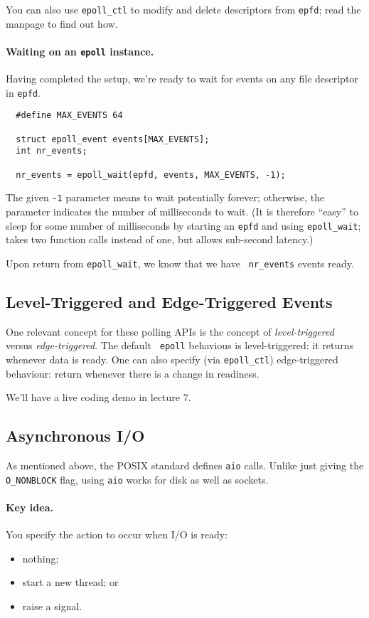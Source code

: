 \documentclass[11pt]{article}
\begin{document}
You can also use {\tt epoll\_ctl} to modify and delete descriptors from {\tt epfd}; read the manpage to find out how.

\paragraph{Waiting on an {\tt epoll} instance.} Having completed
the setup, we're ready to wait for events on any file descriptor in {\tt epfd}.
    \begin{lstlisting}
  #define MAX_EVENTS 64

  struct epoll_event events[MAX_EVENTS];
  int nr_events;

  nr_events = epoll_wait(epfd, events, MAX_EVENTS, -1);
    \end{lstlisting}

The given {\tt -1} parameter means to wait potentially forever;
otherwise, the parameter indicates the number of milliseconds to wait.
(It is therefore ``easy'' to sleep for some number of milliseconds by
starting an {\tt epfd} and using {\tt epoll\_wait}; takes two function
calls instead of one, but allows sub-second latency.)

Upon return from {\tt epoll\_wait}, we know that we have {\tt
  nr\_events} events ready.

\subsection*{Level-Triggered and Edge-Triggered Events}
One relevant concept for these polling APIs is the concept of
\emph{level-triggered} versus \emph{edge-triggered}.  The default {\tt
  epoll} behavious is level-triggered: it returns whenever data is
ready. One can also specify (via {\tt epoll\_ctl}) edge-triggered
behaviour: return whenever there is a change in readiness.

We'll have a live coding demo in lecture 7.

\subsection*{Asynchronous I/O}
As mentioned above, the POSIX standard defines {\tt aio} calls.
Unlike just giving the {\tt O\_NONBLOCK} flag, using {\tt aio} works
for disk as well as sockets.

\paragraph{Key idea.} You specify the action to occur when I/O is ready:
    \begin{itemize}
      \item nothing;
      \item start a new thread; or
      \item raise a signal.
    \end{itemize}
\end{document}
